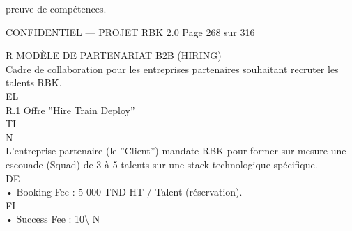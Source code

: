 \documentclass[12pt,landscape,a4paper]{article}
\newenvironment{confidential}
{\begin{tcolorbox}[
    colback=rbkred!5!white,
    colframe=rbkred!75!black,
    title=CONFIDENTIEL,
    fonttitle=\bfseries\color{white},
    coltitle=rbkred!75!black,
    breakable,
    enhanced,
    frame hidden,
    borderline west={2pt}{0pt}{rbkred!75!black}
]}
{\end{tcolorbox}}
\begin{document}
preuve de compétences.\\
\vspace{0.5em}
\vspace{0.5em}
\vspace{0.5em}
\vspace{0.5em}
\begin{confidential}CONFIDENTIEL — PROJET RBK 2.0                                            Page 268 sur 316\end{confidential}
R \textbar{} MODÈLE DE PARTENARIAT B2B (HIRING)\\
\vspace{0.5em}
\vspace{0.5em}
Cadre de collaboration pour les entreprises partenaires souhaitant recruter les talents RBK.\\
\vspace{0.5em}
\vspace{0.5em}
\vspace{0.5em}
\vspace{0.5em}
EL\\
R.1    Offre ”Hire Train Deploy”\\
\vspace{0.5em}
\vspace{0.5em}
\vspace{0.5em}
\vspace{0.5em}
TI\\
N\\
L’entreprise partenaire (le ”Client”) mandate RBK pour former sur mesure une escouade (Squad) de 3 à 5 talents sur une stack technologique spécifique.\\
\vspace{0.5em}
\vspace{0.5em}
\vspace{0.5em}
\vspace{0.5em}
DE\\
• Booking Fee : 5 000 TND HT / Talent (réservation).\\
\vspace{0.5em}
\vspace{0.5em}
\vspace{0.5em}
\vspace{0.5em}
FI\\
• Success Fee : 10\textbackslash{}%
\vspace{0.5em}
\vspace{0.5em}
\vspace{0.5em}
N\\
\end{document}
